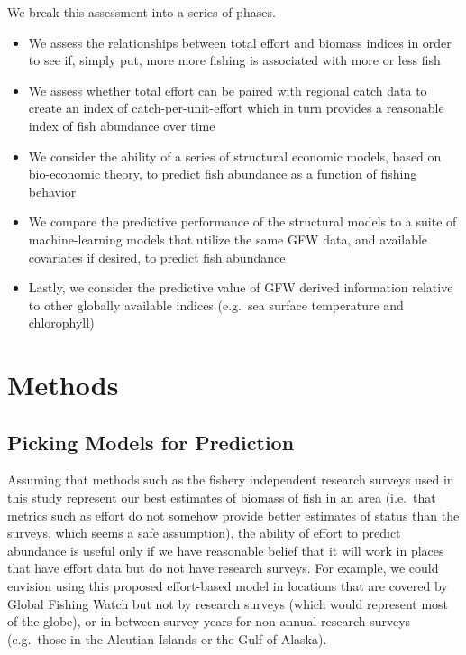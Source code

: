 \documentclass[twoside,12pt,final]{ucthesis-CA2012}
\begin{document}
\begin{ucmainmatter}
We break this assessment into a series of phases.
\begin{itemize}
\item
  We assess the relationships between total effort and biomass indices
  in order to see if, simply put, more more fishing is associated with
  more or less fish
\item
  We assess whether total effort can be paired with regional catch data
  to create an index of catch-per-unit-effort which in turn provides a
  reasonable index of fish abundance over time
\item
  We consider the ability of a series of structural economic models,
  based on bio-economic theory, to predict fish abundance as a function
  of fishing behavior
\item
  We compare the predictive performance of the structural models to a
  suite of machine-learning models that utilize the same GFW data, and
  available covariates if desired, to predict fish abundance
\item
  Lastly, we consider the predictive value of GFW derived information
  relative to other globally available indices (e.g.~sea surface
  temperature and chlorophyll)
\end{itemize}
\section{Methods}\label{methods}

\subsection{Picking Models for
Prediction}\label{picking-models-for-prediction}

Assuming that methods such as the fishery independent research surveys
used in this study represent our best estimates of biomass of fish in an
area (i.e.~that metrics such as effort do not somehow provide better
estimates of status than the surveys, which seems a safe assumption),
the ability of effort to predict abundance is useful only if we have
reasonable belief that it will work in places that have effort data but
do not have research surveys. For example, we could envision using this
proposed effort-based model in locations that are covered by Global
Fishing Watch but not by research surveys (which would represent most of
the globe), or in between survey years for non-annual research surveys
(e.g.~those in the Aleutian Islands or the Gulf of Alaska).


\end{ucmainmatter}
\end{document}
